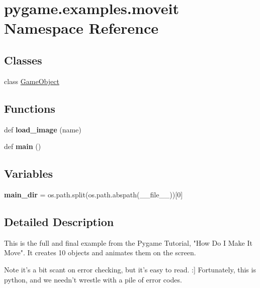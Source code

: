 \hypertarget{namespacepygame_1_1examples_1_1moveit}{}\section{pygame.\+examples.\+moveit Namespace Reference}
\label{namespacepygame_1_1examples_1_1moveit}
\subsection*{Classes}
\begin{DoxyCompactItemize}
\item 
class \hyperlink{classpygame_1_1examples_1_1moveit_1_1_game_object}{Game\+Object}
\end{DoxyCompactItemize}
\subsection*{Functions}
\begin{DoxyCompactItemize}
\item 
\mbox{\label{namespacepygame_1_1examples_1_1moveit_a7e280d9f9c8e3c8f79487aea7fc67421}} 
def {\bfseries load\+\_\+image} (name)
\item 
\mbox{\label{namespacepygame_1_1examples_1_1moveit_afb8ea7437900e7096efab6493b461e58}} 
def {\bfseries main} ()
\end{DoxyCompactItemize}
\subsection*{Variables}
\begin{DoxyCompactItemize}
\item 
\mbox{\label{namespacepygame_1_1examples_1_1moveit_a696723f439d4bed8ed1a54a0cecf6f1c}} 
{\bfseries main\+\_\+dir} = os.\+path.\+split(os.\+path.\+abspath(\+\_\+\+\_\+file\+\_\+\+\_\+))\mbox{[}0\mbox{]}
\end{DoxyCompactItemize}


\subsection{Detailed Description}
\begin{DoxyVerb}This is the full and final example from the Pygame Tutorial,
"How Do I Make It Move". It creates 10 objects and animates
them on the screen.

Note it's a bit scant on error checking, but it's easy to read. :]
Fortunately, this is python, and we needn't wrestle with a pile of
error codes.
\end{DoxyVerb}
 